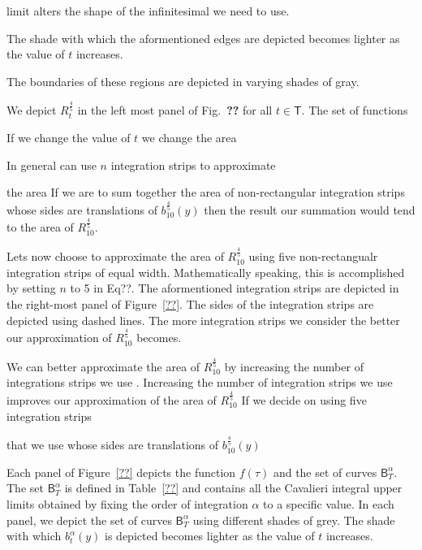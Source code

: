 \documentclass{article}
\theoremstyle{theorem}
\theoremstyle{definition}
\begin{document}
limit alters the
shape of the infinitesimal we need to use.


The shade with which the aformentioned edges are depicted becomes lighter as the value of $t$ increases.



The boundaries of these regions are depicted in varying shades of gray.  


We depict $R_{t}^{\frac{4}{5}}$ in the left most panel of Fig.~\textbf{??} for all $t\in\mathsf{T}$. The set of functions   





If we change the value of $t$ we change the area 


In general can use $n$ integration strips to approximate 



the area If we are to sum together the area of  non-rectangular integration strips whose sides are translations of $b_{10}^{\frac{4}{5}}(y)$ then the result our summation would tend to
the area of $R_{10}^{\frac{4}{5}}$. 


Lets now choose to approximate the area of $R_{10}^{\frac{4}{5}}$ using five non-rectangualr integration strips of equal width. Mathematically speaking, this is accomplished 
by setting $n$ to 5 in Eq??. The aformentioned integration strips are depicted in the right-most panel of Figure~\ref{??}.
The sides of the integration strips are depicted using dashed lines. The more integration strips we consider the better our approximation of $R_{10}^{\frac{4}{5}}$ becomes. 



We can better approximate the area of $R_{10}^{\frac{4}{5}}$ by increasing the number of integrations strips we use .   Increasing the number of integration strips we use improves our approximation of the area of $R_{10}^{\frac{4}{5}}$  
If we decide on using five integration strips 


that 
we use whose sides are translations of $b_{10}^{\frac{4}{5}}(y)$ 


Each panel of 
Figure~\ref{??} depicts the function $f(\tau)$ and the set of curves $\mathsf{B}_T^{\alpha}$. The set $\mathsf{B}_T^{\alpha}$ is defined in Table~\ref{??} and contains 
all the Cavalieri integral upper limits obtained by fixing the order of integration $\alpha$ to a specific value. In each panel, we depict the set of curves $\mathsf{B}_T^{\alpha}$ using different shades of grey. 
The shade with which $b_t^{\alpha}(y)$ is depicted becomes lighter as the value of $t$ increases.
\end{document}
